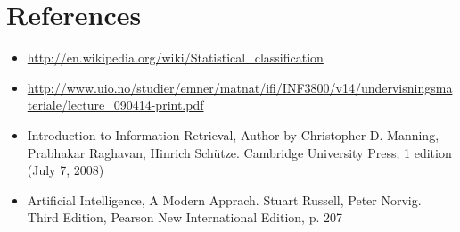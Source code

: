 \documentclass[11pt,english,a4paper]{article}
\begin{document}


\section*{References}
\begin{itemize}
\item \url{http://en.wikipedia.org/wiki/Statistical_classification}
\item \url{http://www.uio.no/studier/emner/matnat/ifi/INF3800/v14/undervisningsmateriale/lecture_090414-print.pdf}
\item Introduction to Information Retrieval, Author by Christopher D. Manning, Prabhakar Raghavan, Hinrich Schütze. Cambridge University Press; 1 edition (July 7, 2008)
\item Artificial Intelligence, A Modern Apprach. Stuart Russell, Peter Norvig. Third Edition, Pearson New International Edition, p. 207
\end{itemize}


\end{document}
